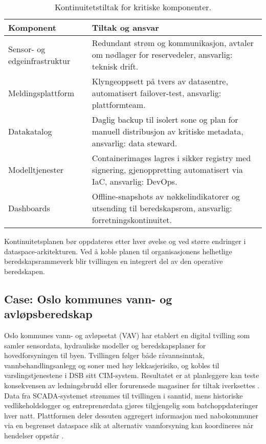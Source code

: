 \begin{table}[ht]
    \centering
    \caption{Kontinuitetstiltak for kritiske komponenter.}
    \label{tab:kap03-kontinuitet}
    \begin{tabular}{p{}p{}}
        \toprule
        \textbf{Komponent} & \textbf{Tiltak og ansvar} \\
        \midrule
        Sensor- og edgeinfrastruktur & Redundant strøm og kommunikasjon, avtaler om nødlager for reservedeler, ansvarlig: teknisk drift. \\
        Meldingsplattform & Klyngeoppsett på tvers av datasentre, automatisert failover-test, ansvarlig: plattformteam. \\
        Datakatalog & Daglig backup til isolert sone og plan for manuell distribusjon av kritiske metadata, ansvarlig: data steward. \\
        Modelltjenester & Containerimages lagres i sikker registry med signering, gjenoppretting automatisert via IaC, ansvarlig: DevOps. \\
        Dashboards & Offline-snapshots av nøkkelindikatorer og utsending til beredskapsrom, ansvarlig: forretningskontinuitet. \\
        \bottomrule
    \end{tabular}
\end{table}

Kontinuitetsplanen bør oppdateres etter hver øvelse og ved større endringer i dataspace-arkitekturen. Ved å koble planen til
organisasjonens helhetlige beredskapsrammeverk blir tvillingen en integrert del av den operative beredskapen.

\subsection{Case: Oslo kommunes vann- og avløpsberedskap}
Oslo kommunes vann- og avløpsetat (VAV) har etablert en digital tvilling som samler sensordata, hydrauliske modeller og
beredskapsplaner for hovedforsyningen til byen. Tvillingen følger både råvannsinntak, vannbehandlingsanlegg og soner med høy
lekkasjerisiko, og kobles til varslingstjenestene i DSB sitt CIM-system. Resultatet er at planleggere kan teste konsekvensen av
ledningsbrudd eller forurensede magasiner før tiltak iverksettes \citep{oslovav2023digital}. Data fra SCADA-systemet strømmes til
tvillingen i sanntid, mens historiske vedlikeholdslogger og entreprenørdata gjøres tilgjengelig som batchoppdateringer hver
natt. Plattformen deler dessuten aggregert informasjon med nabokommuner via en begrenset dataspace slik at alternativ
vannforsyning kan koordineres når hendelser oppstår \citep{norskvann2023digitaltvilling}.

